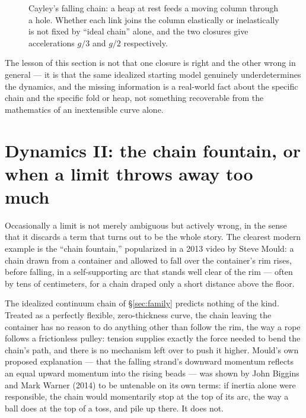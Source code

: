 \documentclass[11pt]{book}
\begin{document}
\begin{figure}[h]
\centering
{}
\caption{Cayley's falling chain: a heap at rest feeds a moving column through a hole. Whether each link joins the column elastically or inelastically is not fixed by ``ideal chain'' alone, and the two closures give accelerations $g/3$ and $g/2$ respectively.}
\label{fig:heap}
\end{figure}

The lesson of this section is not that one closure is right and the other wrong in general --- it is that the same idealized starting model genuinely underdetermines the dynamics, and the missing information is a real-world fact about the specific chain and the specific fold or heap, not something recoverable from the mathematics of an inextensible curve alone.

\section[Dynamics II: the chain fountain]{Dynamics II: the chain fountain, or when a limit throws away too much}
\label{sec:fountain}

Occasionally a limit is not merely ambiguous but actively wrong, in the sense that it discards a term that turns out to be the whole story. The clearest modern example is the ``chain fountain,'' popularized in a 2013 video by Steve Mould: a chain drawn from a container and allowed to fall over the container's rim rises, before falling, in a self-supporting arc that stands well clear of the rim --- often by tens of centimeters, for a chain draped only a short distance above the floor.

The idealized continuum chain of \S\ref{sec:family} predicts nothing of the kind. Treated as a perfectly flexible, zero-thickness curve, the chain leaving the container has no reason to do anything other than follow the rim, the way a rope follows a frictionless pulley: tension supplies exactly the force needed to bend the chain's path, and there is no mechanism left over to push it higher. Mould's own proposed explanation --- that the falling strand's downward momentum reflects an equal upward momentum into the rising beads --- was shown by John Biggins and Mark Warner (2014) to be untenable on its own terms: if inertia alone were responsible, the chain would momentarily stop at the top of its arc, the way a ball does at the top of a toss, and pile up there. It does not.
\end{document}
